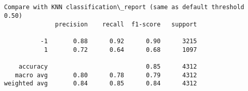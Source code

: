 \documentclass[11pt]{article}
\begin{document}
    \begin{center}
    \end{center}
    { \hspace*{\fill} \\}
    
    \begin{Verbatim}[commandchars=\\\{\}]

Compare with KNN classification\_report (same as default threshold 0.50)
              precision    recall  f1-score   support

          -1       0.88      0.92      0.90      3215
           1       0.72      0.64      0.68      1097

    accuracy                           0.85      4312
   macro avg       0.80      0.78      0.79      4312
weighted avg       0.84      0.85      0.84      4312


    \end{Verbatim}
\end{document}
